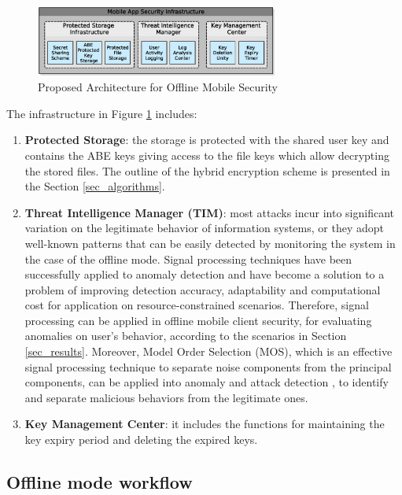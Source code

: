 \documentclass[twocolumn]{svjour3}          	%
\begin{document}
\begin{figure}[h!]
	\centering
	\includegraphics[width=8cm]{fig03.eps}
	\caption{Proposed Architecture for Offline Mobile Security }
	\label{fig:03}
\end{figure}

The infrastructure in Figure \ref{fig:03} includes:

\begin{enumerate}
	\item \textbf{Protected Storage}: the storage is protected with the shared user key and contains the ABE keys giving access to the file keys which allow decrypting the stored files. The outline of the hybrid encryption scheme is presented in the Section \ref{sec_algorithms}.
	\item \textbf{Threat Intelligence Manager (TIM)}: most attacks incur into significant variation on the legitimate behavior of information systems, or they adopt well-known patterns that can be easily detected by monitoring the system in the case of the offline mode. Signal processing techniques have been successfully applied to anomaly detection \cite{lu2009network, huang2009signal} and have become a solution to a problem of improving detection accuracy, adaptability and computational cost for application on resource-constrained scenarios. Therefore, signal processing can be applied in offline mobile client security, for evaluating anomalies on user's behavior, according to the scenarios in Section \ref{sec_results}. Moreover, Model Order Selection (MOS), which is an effective signal processing technique to separate noise components from the principal components, can be applied into anomaly and attack detection \cite{tenorio2013greatest}, to identify and separate malicious behaviors from the legitimate ones.
	\item \textbf{Key Management Center}: it includes the functions for maintaining the key expiry period and deleting the expired keys. 
\end{enumerate}

\subsection{Offline mode workflow}
\label{sec_offline_mode_workflow}
\end{document}
